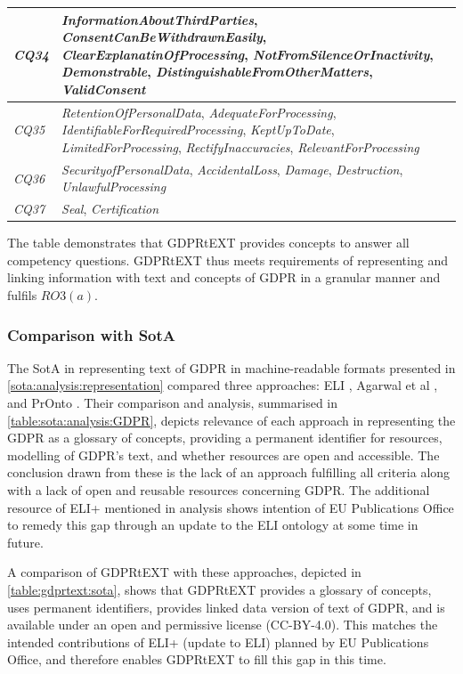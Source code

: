 \begin{table}[htbp]
\begin{tabularx}{\textwidth}{|l|X|}
\textit{CQ34} & \textit{InformationAboutThirdParties}, \textit{ConsentCanBeWithdrawnEasily}, \textit{ClearExplanatinOfProcessing}, \textit{NotFromSilenceOrInactivity}, \textit{Demonstrable}, \textit{DistinguishableFromOtherMatters}, \textit{ValidConsent} \\ \hline
\textit{CQ35} & \textit{RetentionOfPersonalData}, \textit{AdequateForProcessing}, \textit{IdentifiableForRequiredProcessing}, \textit{KeptUpToDate}, \textit{LimitedForProcessing}, \textit{RectifyInaccuracies}, \textit{RelevantForProcessing} \\ \hline
\textit{CQ36} & \textit{SecurityofPersonalData}, \textit{AccidentalLoss}, \textit{Damage}, \textit{Destruction}, \textit{UnlawfulProcessing} \\ \hline
\textit{CQ37} & \textit{Seal}, \textit{Certification}
\end{tabularx}
\end{table}
The table demonstrates that GDPRtEXT provides concepts to answer all  competency questions. GDPRtEXT thus meets requirements of representing and linking information with text and concepts of GDPR in a granular manner and fulfils $RO3(a)$.

\subsubsection{Comparison with SotA}
The SotA in representing text of GDPR in machine-readable formats presented in \autoref{sota:analysis:representation} compared three approaches: ELI \cite{thomas_european_2019}, Agarwal et al \cite{agarwal_legislative_2018}, and PrOnto \cite{palmirani_pronto_2018,palmirani_pronto_2018-1}.
Their comparison and analysis, summarised in \autoref{table:sota:analysis:GDPR}, depicts relevance of each approach in representing the GDPR as a glossary of concepts, providing a permanent identifier for resources, modelling of GDPR's text, and whether resources are open and accessible.
The conclusion drawn from these is the lack of an approach fulfilling all criteria along with a lack of open and reusable resources concerning GDPR. 
The additional resource of ELI+ mentioned in analysis shows intention of EU Publications Office to remedy this gap through an update to the ELI ontology at some time in future.

A comparison of GDPRtEXT with these approaches, depicted in \autoref{table:gdprtext:sota}, shows that GDPRtEXT provides a glossary of concepts, uses permanent identifiers, provides linked data version of text of GDPR, and is available under an open and permissive license (CC-BY-4.0).
This matches the intended contributions of ELI+ (update to ELI) planned by EU Publications Office, and therefore enables GDPRtEXT to fill this gap in this time.

